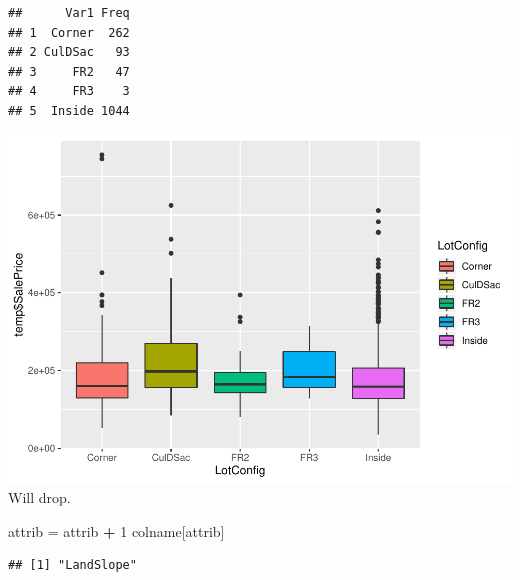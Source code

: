 \documentclass[]{article}
\newenvironment{Shaded}{\begin{snugshade}}{\end{snugshade}}
\newcommand{\DecValTok}[1]{\textcolor[rgb]{0.00,0.00,0.81}{#1}}
\newcommand{\StringTok}[1]{\textcolor[rgb]{0.31,0.60,0.02}{#1}}
\newcommand{\OperatorTok}[1]{\textcolor[rgb]{0.81,0.36,0.00}{\textbf{#1}}}
\newcommand{\NormalTok}[1]{#1}
\begin{document}
\begin{verbatim}
##      Var1 Freq
## 1  Corner  262
## 2 CulDSac   93
## 3     FR2   47
## 4     FR3    3
## 5  Inside 1044
\end{verbatim}

\includegraphics{EDA_files/figure-latex/unnamed-chunk-33-1.pdf} Will
drop.

\begin{Shaded}
\begin{Highlighting}[]
\NormalTok{attrib =}\StringTok{ }\NormalTok{attrib }\OperatorTok{+}\StringTok{ }\DecValTok{1}
\NormalTok{colname[attrib]}
\end{Highlighting}
\end{Shaded}

\begin{verbatim}
## [1] "LandSlope"
\end{verbatim}
\end{document}
